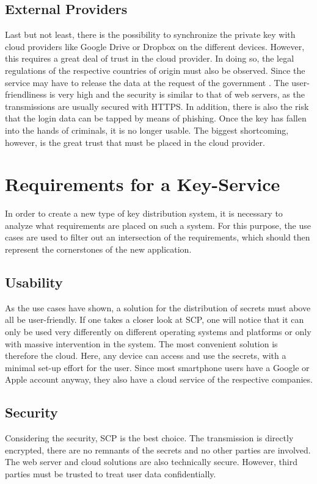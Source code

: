 \documentclass[12pt,oneside,a4paper,parskip]{scrbook}
\begin{document}
\newpage
\subsection{External Providers}
Last but not least, there is the possibility to synchronize the private key with cloud providers like Google Drive or Dropbox on the different devices. However, this requires a great deal of trust in the cloud provider. In doing so, the legal regulations of the respective countries of origin must also be observed. Since the service may have to release the data at the request of the government \parencite{heise_us_nodate}. \newline
The user-friendliness is very high and the security is similar to that of web servers, as the transmissions are usually secured with HTTPS. In addition, there is also the risk that the login data can be tapped by means of phishing. Once the key has fallen into the hands of criminals, it is no longer usable. The biggest shortcoming, however, is the great trust that must be placed in the cloud provider. 


\section{Requirements for a Key-Service}
In order to create a new type of key distribution system, it is necessary to analyze what requirements are placed on such a system. For this purpose, the use cases are used to filter out an intersection of the requirements, which should then represent the cornerstones of the new application.

\subsection{Usability}
As the use cases have shown, a solution for the distribution of secrets must above all be user-friendly. If one takes a closer look at SCP, one will notice that it can only be used very differently on different operating systems and platforms or only with massive intervention in the system. The most convenient solution is therefore the cloud. Here, any device can access and use the secrets, with a minimal set-up effort for the user. Since most smartphone users have a Google or Apple account anyway, they also have a cloud service of the respective companies.

\newpage
\subsection{Security}
Considering the security, SCP is the best choice. The transmission is directly encrypted, there are no remnants of the secrets and no other parties are involved. The web server and cloud solutions are also technically secure. However, third parties must be trusted to treat user data confidentially.
\end{document}
